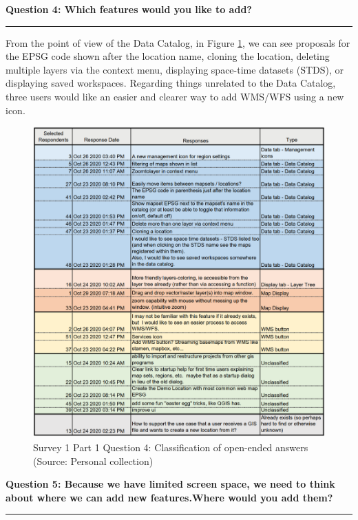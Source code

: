 \documentclass[a4paper,10pt,twoside]{article}
\begin{document}
\newpage
\noindent \textbf{Question 4: Which features would you like to add?}
\par\noindent\rule{\textwidth}{0.4pt}

\noindent From the point of view of the Data Catalog, in Figure
\ref{fig:survey1_part1_question4_open_ended}, we can see proposals for
the EPSG code shown after the location name, cloning the location,
deleting multiple layers via the context menu, displaying space-time
datasets (STDS), or displaying saved workspaces. Regarding things
unrelated to the Data Catalog, three users would like an easier and
clearer way to add WMS/WFS using a new icon.

\begin{figure}[hbt!] 
\begin{center}
\includegraphics[width=15.5cm]{../surveys/analyzed_data/survey1_part1_question4_open_ended.png} 
\caption[Survey 1 Part 1 Question 4: Classification of open-ended answers]{Survey 1 Part 1 Question 4: Classification of open-ended answers (Source: Personal collection)}
\label{fig:survey1_part1_question4_open_ended}
\end{center}
\end{figure}

\newpage
\noindent \textbf{Question 5: Because we have limited screen space, we need to think about where we can add new features.Where would you add them?}
\par\noindent\rule{\textwidth}{0.4pt}
\end{document}
